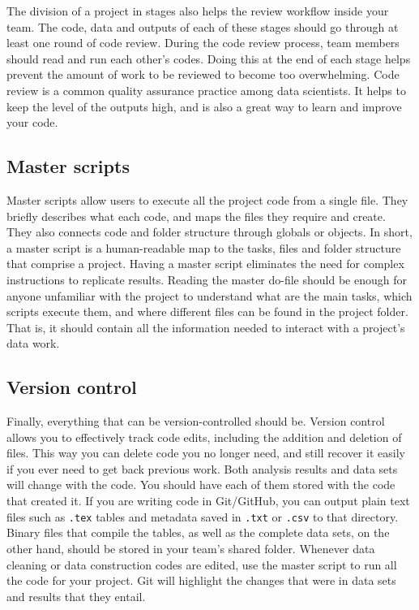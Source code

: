 The division of a project in stages also helps the review workflow inside your team.
The code, data and outputs of each of these stages should go through at least one round of code review.
During the code review process, team members should read and run each other's codes.
Doing this at the end of each stage helps prevent the amount of work to be reviewed to become too overwhelming.
Code review is a common quality assurance practice among data scientists.
It helps to keep the level of the outputs high, and is also a great way to learn and improve your code.

\subsection{Master scripts}
Master scripts allow users to execute all the project code from a single file.
They briefly describes what each code, 
and maps the files they require and create. 
They also connects code and folder structure through globals or objects. 
In short, a master script is a human-readable map to the tasks, 
files and folder structure that comprise a project.  
Having a master script eliminates the need for complex instructions to replicate results. 
Reading the master do-file should be enough for anyone unfamiliar with the project
to understand what are the main tasks, which scripts execute them,
and where different files can be found in the project folder. 
That is, it should contain all the information needed to interact with a project's data work.

\subsection{Version control}
Finally, everything that can be version-controlled should be. 
Version control allows you to effectively track code edits,
including the addition and deletion of files. 
This way you can delete code you no longer need, 
and still recover it easily if you ever need to get back previous work.
Both analysis results and data sets will change with the code.
You should have each of them stored with the code that created it.
If you are writing code in Git/GitHub,
you can output plain text files such as \texttt{.tex} tables
and metadata saved in \texttt{.txt} or \texttt{.csv} to that directory.
Binary files that compile the tables,
as well as the complete data sets, on the other hand,
should be stored in your team's shared folder. 
Whenever data cleaning or data construction codes are edited,
use the master script to run all the code for your project.
Git will highlight the changes that were in data sets and results that they entail. 

